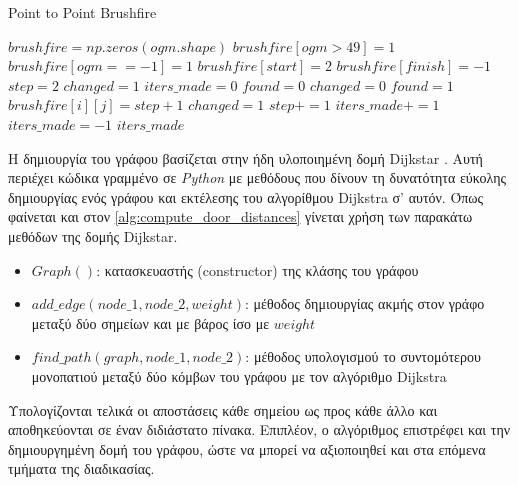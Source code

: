 \begin{algorithm}[!htb]
\caption{Point to Point Brushfire}
\label{alg:point_to_point_brushfire}
\begin{algorithmic}[1]
    \State $brushfire = np.zeros(ogm.shape)$
    \State $brushfire[ogm > 49] = 1$
    \State $brushfire[ogm == -1] = 1$
    \State $brushfire[start] = 2$
    \State $brushfire[finish] = -1$
    \State $step = 2$
    \State $changed = 1$
    \State $iters\_made = 0$
    \State $found = 0$
        \State $changed = 0$
                        \State $found = 1$
                    \EndIf
                    \State $brushfire[i][j] = step + 1$
                    \State $changed = 1$
                \EndIf
            \EndFor
        \EndFor
        \State $step += 1$
        \State $iters\_made += 1$
    \EndWhile
        \State $iters\_made = -1$
    \EndIf
    \State \Return $iters\_made$
\end{algorithmic}
\end{algorithm}


Η δημιουργία του γράφου βασίζεται στην ήδη υλοποιημένη δομή Dijkstar \cite{dijkstar}. Αυτή περιέχει κώδικα γραμμένο σε \emph{Python} με μεθόδους που δίνουν τη δυνατότητα εύκολης δημιουργίας ενός γράφου και εκτέλεσης του αλγορίθμου Dijkstra σ' αυτόν. Όπως φαίνεται και στον \ref{alg:compute_door_distances} γίνεται χρήση των παρακάτω μεθόδων της δομής Dijkstar.

\begin{itemize}
    \setlength\itemsep{-0.2em}
    \item $Graph()$: κατασκευαστής (constructor) της κλάσης του γράφου
    \item $add\_edge(node\_1, node\_2, weight)$: μέθοδος δημιουργίας ακμής στον γράφο μεταξύ δύο σημείων και με βάρος ίσο με $weight$ 
    \item $find\_path(graph, node\_1, node\_2)$: μέθοδος υπολογισμού το συντομότερου μονοπατιού μεταξύ δύο κόμβων του γράφου με τον αλγόριθμο Dijkstra
\end{itemize}

Υπολογίζονται τελικά οι αποστάσεις κάθε σημείου ως προς κάθε άλλο και αποθηκεύονται σε έναν διδιάστατο πίνακα. Επιπλέον, ο αλγόριθμος επιστρέφει και την δημιουργημένη δομή του γράφου, ώστε να μπορεί να αξιοποιηθεί και στα επόμενα τμήματα της διαδικασίας.



